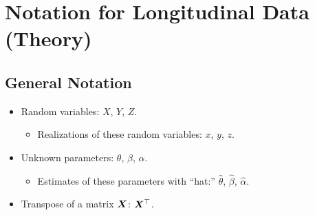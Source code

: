 \section{Notation for Longitudinal Data (Theory)}
\subsection*{General Notation}
\begin{itemize}
      \item Random variables: $ X $, $ Y $, $ Z $.
            \begin{itemize}
                  \item Realizations of these random variables: $ x $, $ y $, $ z $.
            \end{itemize}
      \item Unknown parameters:
            $ \theta $, $ \beta $, $ \alpha $.
            \begin{itemize}
                  \item Estimates of these parameters with ``hat:''
                        $ \hat{\theta} $, $ \hat{\beta} $, $ \hat{\alpha} $.
            \end{itemize}
      \item Transpose of a matrix $ \bm{X} $: $ \bm{X}^\top $.
\end{itemize}
